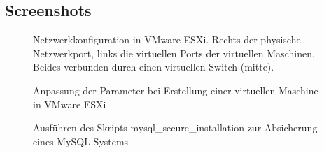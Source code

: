 \subsection{Screenshots}
\label{Screenshots}

\begin{figure}[htb]
\centering
{}
\caption{Netzwerkkonfiguration in VMware ESXi. Rechts der physische Netzwerkport, links die virtuellen Ports der virtuellen Maschinen. Beides verbunden durch einen virtuellen Switch (mitte).}
\label{screen:vmnetwork}
\end{figure}

\begin{figure}[htb]
\centering
{}
\caption{Anpassung der Parameter bei Erstellung einer virtuellen Maschine in VMware ESXi}
\label{screen:vmcreation}
\end{figure}
\clearpage

\begin{figure}[!htb]
\centering
{}
\caption{Ausführen des Skripts \glqq{}mysql\_{}secure\_{}installation\grqq{} zur Absicherung eines MySQL-Systems}
\label{screen:mysqlsecure}
\end{figure}